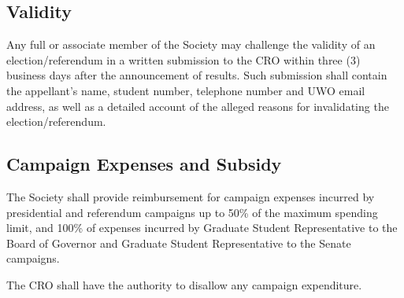 \subsection{Validity}

\begin{longenum}[ label*=\thesubsection.\arabic*., align=left]
	\item Any full or associate member of the Society may challenge the validity of an election/referendum in a written submission to the CRO within three (3) business days after the announcement of results. Such submission shall contain the appellant's name, student number, telephone number and UWO email address, as well as a detailed account of the alleged reasons for invalidating the election/referendum.
	
\end{longenum}

\subsection{Campaign Expenses and Subsidy}

\begin{longenum}[ label*=\thesubsection.\arabic*., align=left]
	\item The Society shall provide reimbursement for campaign expenses incurred by
presidential and referendum campaigns up to 50\% of the maximum spending limit, and 100\% of expenses incurred by Graduate Student Representative to the Board of Governor and Graduate Student Representative to the Senate campaigns.
    \item The CRO shall have the authority to disallow any campaign expenditure. 
\end{longenum}